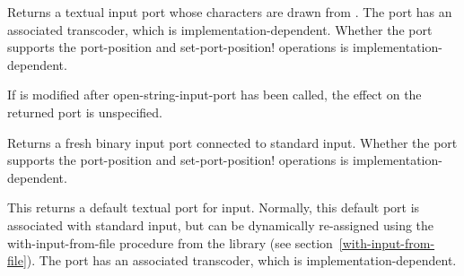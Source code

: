 \begin{entry}{%
}

Returns a textual input port whose characters are drawn from
.  The port has an associated transcoder, which is implementation-dependent.
Whether the port supports
the {\cf port-position} and {\cf set-port-position!} operations
is implementation-dependent.

If  is modified after {\cf open-string-input-port}
has been called, the effect on the returned port is unspecified.
\end{entry}

\begin{entry}{%
}
   
Returns a fresh binary input port connected to standard input.
Whether the port supports the {\cf port-position} and {\cf
  set-port-position!} operations is implementation-dependent.
\end{entry}

\begin{entry}{%
}
 
This returns a default textual port for input.  Normally, this default port
is associated with standard input, but can be dynamically re-assigned
using the {\cf with-input-from-file} procedure from the
 library (see section~\ref{with-input-from-file}).
The port has an associated transcoder, which is implementation-dependent.
\end{entry}


